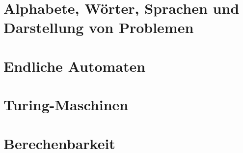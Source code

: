 \documentclass{article}
\begin{document}
\newpage





\newsection
\section{Alphabete, Wörter, Sprachen und Darstellung von Problemen}





\newsection
\section{Endliche Automaten}





\newsection
\section{Turing-Maschinen}
\setcounter{subsection}{2}




\newsection
\section{Berechenbarkeit}


\end{document}
